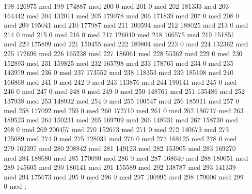 {198 126975 med
199 174887 med
200 0 med
201 0 med
202 181333 med
203 164442 med
204 132011 med
205 179078 med
206 171839 med
207 0 med
208 0 med
209 195041 med
210 177987 med
211 100594 med
212 188025 med
213 0 med
214 0 med
215 0 med
216 0 med
217 126040 med
218 166575 med
219 151851 med
220 175899 med
221 150455 med
222 189804 med
223 0 med
224 132362 med
225 172696 med
226 165238 med
227 186061 med
228 55362 med
229 0 med
230 152893 med
231 159825 med
232 165798 med
233 178765 med
234 0 med
235 143979 med
236 0 med
237 173552 med
238 118353 med
239 185108 med
240 166868 med
241 0 med
242 0 med
243 113876 med
244 190141 med
245 0 med
246 0 med
247 0 med
248 0 med
249 0 med
250 148761 med
251 135486 med
252 137938 med
253 148932 med
254 0 med
255 100547 med
256 185911 med
257 0 med
258 177092 med
259 0 med
260 172710 med
261 0 med
262 186717 med
263 189523 med
264 150231 med
265 169709 med
266 148931 med
267 158730 med
268 0 med
269 200457 med
270 152673 med
271 0 med
272 140673 med
273 125089 med
274 0 med
275 128031 med
276 0 med
277 168125 med
278 0 med
279 162397 med
280 208842 med
281 149123 med
282 153905 med
283 169270 med
284 188680 med
285 170090 med
286 0 med
287 168640 med
288 180051 med
289 145605 med
290 180141 med
291 155589 med
292 138787 med
293 141339 med
294 175673 med
295 0 med
296 0 med
297 100995 med
298 179006 med
299 0 med
};
